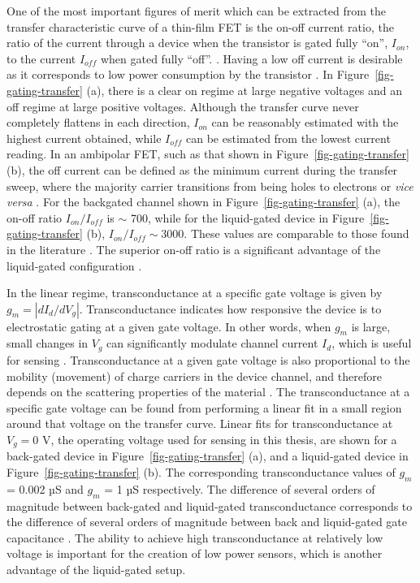 \documentclass[
  a4paper,
]{scrbook}
\begin{document}
One of the most important figures of merit which can be extracted from
the transfer characteristic curve of a thin-film FET is the on-off
current ratio, the ratio of the current through a device when the
transistor is gated fully ``on'', \(I_{on}\), to the current \(I_{off}\)
when gated fully ``off''. \autocite{Kauffman2008,Petti2016,Shkodra2021}.
Having a low off current is desirable as it corresponds to low power
consumption by the transistor \autocite{Rouhi2010}. In
Figure~\ref{fig-gating-transfer} (a), there is a clear on regime at
large negative voltages and an off regime at large positive voltages.
Although the transfer curve never completely flattens in each direction,
\(I_{on}\) can be reasonably estimated with the highest current
obtained, while \(I_{off}\) can be estimated from the lowest current
reading. In an ambipolar FET, such as that shown in
Figure~\ref{fig-gating-transfer} (b), the off current can be defined as
the minimum current during the transfer sweep, where the majority
carrier transitions from being holes to electrons or \emph{vice versa}
\autocite{Petti2016,Zheng2017}. For the backgated channel shown in
Figure~\ref{fig-gating-transfer} (a), the on-off ratio
\(I_{on}/I_{off}\) is \(\sim\) 700, while for the liquid-gated device in
Figure~\ref{fig-gating-transfer} (b), \(I_{on}/I_{off} \sim 3000\).
These values are comparable to those found in the literature
\autocite{Avouris2007,Kauffman2008,Heller2010}. The superior on-off
ratio is a significant advantage of the liquid-gated configuration
\autocite{Shkodra2021}.

In the linear regime, transconductance at a specific gate voltage is
given by \(g_m = |dI_{d}/dV_g|\). Transconductance indicates how
responsive the device is to electrostatic gating at a given gate
voltage. In other words, when \(g_m\) is large, small changes in \(V_g\)
can significantly modulate channel current \(I_d\), which is useful for
sensing \autocite{Heller2009a,Ohno2015,Kireev2017}. Transconductance at
a given gate voltage is also proportional to the mobility (movement) of
charge carriers in the device channel, and therefore depends on the
scattering properties of the material
\autocite{Rouhi2010,Petti2016,Li2023}. The transconductance at a
specific gate voltage can be found from performing a linear fit in a
small region around that voltage on the transfer curve. Linear fits for
transconductance at \(V_g = 0\) V, the operating voltage used for
sensing in this thesis, are shown for a back-gated device in
Figure~\ref{fig-gating-transfer} (a), and a liquid-gated device in
Figure~\ref{fig-gating-transfer} (b). The corresponding transconductance
values of \(g_m\) = 0.002 µS and \(g_m\) = 1 µS respectively. The
difference of several orders of magnitude between back-gated and
liquid-gated transconductance corresponds to the difference of several
orders of magnitude between back and liquid-gated gate capacitance
\autocite{Tran2016,Shkodra2021}. The ability to achieve high
transconductance at relatively low voltage is important for the creation
of low power sensors, which is another advantage of the liquid-gated
setup.
\end{document}

